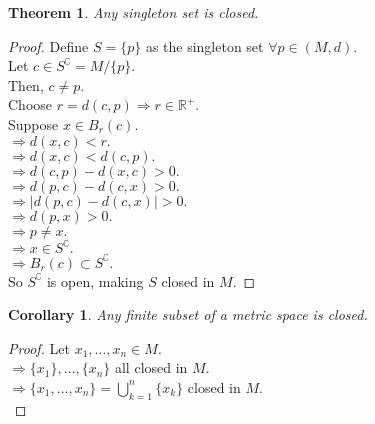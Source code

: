 \documentclass{article}
\newtheorem{theorem}{Theorem}[section]
\newtheorem{corollary}{Corollary}[theorem]
\begin{document}
			\begin{theorem}
				Any singleton set is closed.
			\end{theorem}
			\begin{proof}
				Define $S = \{p\}$ as the singleton set $\forall p \in (M, d)$.\\
				Let $c \in S^\complement = M / \{p\}$.\\
				Then, $c \neq p$.\\
				Choose $r = d(c, p) \Rightarrow r \in \mathbb{R}^+$.\\
				Suppose $x \in B_{r}(c)$.\\
				$\Rightarrow d(x, c) < r.$ \\
				$\Rightarrow d(x, c) < d(c, p).$ \\
				$\Rightarrow d(c, p) - d(x, c) > 0.$ \\
				$\Rightarrow d(p, c) - d(c, x) > 0.$ \\
				$\Rightarrow | d(p, c) - d(c, x) | > 0.$ \\
				$\Rightarrow d(p, x) > 0.$ \\
				$\Rightarrow p \neq x.$ \\
				$\Rightarrow x \in S^\complement.$ \\
				$\Rightarrow B_{r}(c) \subset S^\complement.$ \\
				So $S^\complement$ is open, making $S$ closed in $M$.
			\end{proof}

			\begin{corollary}
				Any finite subset of a metric space is closed.
			\end{corollary}
			\begin{proof}
				Let $x_1, \ldots, x_n \in M$.\\
				$\Rightarrow \{x_1\}, \ldots, \{x_n\}$ all closed in $M$.\\
				$\Rightarrow \{ x_1, \ldots, x_n \} = \bigcup_{k=1}^{n} \{x_k\}$ closed in $M$.\\
			\end{proof}
\end{document}
